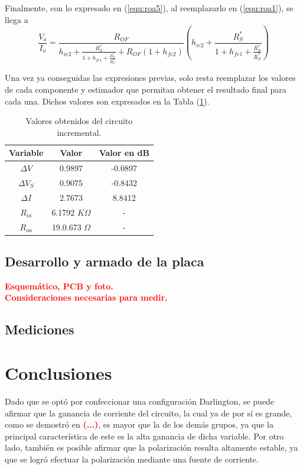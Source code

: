 Finalmente, con lo expresado en (\ref{equ:roa5}), al reemplazarlo en (\ref{equ:roa1}), se llega a
\begin{equation}
	\frac{V_o}{I_o} = \frac{R_{OF}}{h_{ie2} + \frac{R_{S}^{*}} {1 + h_{fe1} + \frac{R_{S}^{*}}{R_{S}^{*}}}  + R_{OF} \left( 1 + h_{fe2} \right)} \left( h_{ie2} + \frac{R_{S}^{*}} {1 + h_{fe1} + \frac{R_{S}^{*}}{R_{S}^{*}}}  \right)
	\label{equ:roa}
\end{equation}

Una vez ya conseguidas las expresiones previas, solo resta reemplazar los valores de cada componente y estimador que permitan obtener el resultado final para cada una. Dichos valores son expresados en la Tabla (\ref{tab:resultados}).

\begin{table}[H]
\centering
\begin{tabular}{ccc}
\hline
\textbf{Variable} & \textbf{Valor} & \textbf{Valor en dB} \\
\hline
$\Delta V$ & 0.9897 & -0.0897 \\
$\Delta V_S$ & 0.9075 & -0.8432 \\
$\Delta I$ & 2.7673 & 8.8412 \\
$R_{ia}$ & 6.1792 $K\Omega$ & - \\
$R_{oa}$ & 19.0.673 $\Omega$ & - \\
\hline
\end{tabular}
\caption{Valores obtenidos del circuito incremental.}
\label{tab:resultados}
\end{table}

\subsection{Desarrollo y armado de la placa}
\begin{center}
	\LARGE{\textcolor{red}{\textbf{Esquemático, PCB y foto.}}}\\
	\LARGE{\textcolor{red}{\textbf{Consideraciones necesarias para medir.}}}
\end{center}

\subsection{Mediciones}

\section{Conclusiones}
Dado que se optó por confeccionar una configuración Darlington, se puede afirmar que la ganancia de corriente del circuito, la cual ya de por sí es grande, como se demostró en \textcolor{red}{\textbf{(...)}}, es mayor que la de los demás grupos, ya que la principal característica de este es la alta ganancia de dicha variable. Por otro lado, también es posible afirmar que la polarización resulta altamente estable, ya que se logró efectuar la polarización mediante una fuente de corriente.
	

